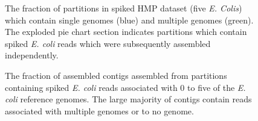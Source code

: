 \documentclass[11pt]{article} %
\begin{document}
\begin{figure}[ht]
\caption{The fraction of partitions in spiked HMP dataset (five
  \emph{E. Colis}) which contain single genomes (blue) and multiple
  genomes (green).  The exploded pie chart section indicates
  partitions which contain spiked \emph{E. coli} reads which were
  subsequently assembled independently. }
\label{ecolimap2}
\end{figure}

\begin{figure}[ht]
\caption{The fraction of assembled contigs assembled from partitions
  containing spiked \emph{E. coli} reads associated with 0 to five of
  the \emph{E. coli} reference genomes.  The large majority of contigs
  contain reads associated with multiple genomes or to no genome.}
\label{fractionassembled}
\end{figure}
\end{document}
